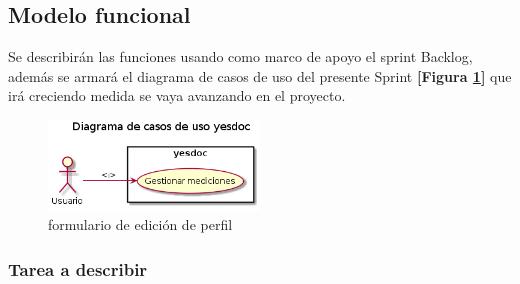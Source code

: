 \documentclass[a4paper,12pt]{article}
\begin{document}


\subsection{Modelo funcional} %
Se describirán las funciones usando como marco de apoyo el sprint Backlog, además se armará el diagrama de casos de uso del presente Sprint \textbf{[Figura \ref{2-caso_de_uso}]} que irá creciendo  medida se vaya avanzando en el proyecto.


    \begin{figure}[h]
        \centering
        \includegraphics[width=0.5\textwidth]{img/2-caso_de_uso}
        \caption{formulario de edición de perfil}
		\label{2-caso_de_uso}
    \end{figure}


	{\scriptsize
	\begin{center} %
	\centering
    	\end{center}
	}
  
 
  
\subsubsection{Tarea a describir}
\end{document}
